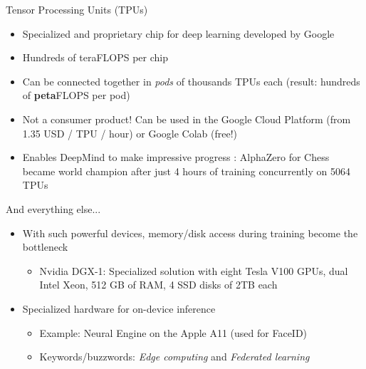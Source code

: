 \begin{frame} {Tensor Processing Units (TPUs)}
  \begin{itemize}
    \item Specialized and proprietary chip for deep learning developed by Google
    \item Hundreds of teraFLOPS per chip
    \item Can be connected together in \emph{pods} of thousands TPUs each (result: hundreds of \textbf{peta}FLOPS per pod)
    \item Not a consumer product! Can be used in the Google Cloud Platform (from 1.35 USD / TPU / hour) or Google Colab (free!)
    \item Enables DeepMind to make impressive progress : AlphaZero for Chess became world champion after just 4 hours of training concurrently on 5064 TPUs
  \end{itemize}
\end{frame}

\begin{frame} {And everything else...}
  \begin{itemize}
    \item With such powerful devices, memory/disk access during training become the bottleneck
    \begin{itemize}
      \item Nvidia DGX-1: Specialized solution with eight Tesla V100 GPUs, dual Intel Xeon, 512 GB of RAM, 4 SSD disks of 2TB each
    \end{itemize}
    \item Specialized hardware for on-device inference
    \begin{itemize}
      \item Example: Neural Engine on the Apple A11 (used for FaceID)
      \item Keywords/buzzwords: \emph{Edge computing} and \emph{Federated learning}
    \end{itemize}
  \end{itemize}
\end{frame}

